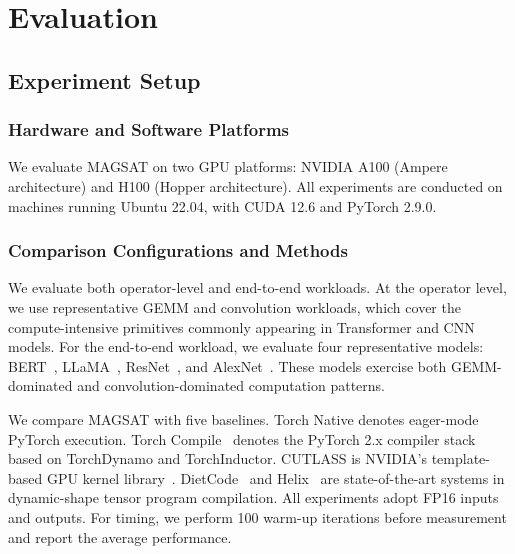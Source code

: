 \section{Evaluation}  %
\label{sec:evaluation}


\subsection{Experiment Setup} 
\label{sec:setup}

\subsubsection{Hardware and Software Platforms} 

We evaluate MAGSAT on two GPU platforms: NVIDIA A100 (Ampere architecture) and H100 (Hopper architecture). 
All experiments are conducted on machines running Ubuntu 22.04, with CUDA 12.6 and PyTorch 2.9.0.

\subsubsection{Comparison Configurations and Methods}

We evaluate both operator-level and end-to-end workloads. At the
operator level, we use representative GEMM and convolution workloads,
which cover the compute-intensive primitives commonly appearing in
Transformer and CNN models. For the end-to-end workload, we evaluate four
representative models: BERT~\cite{devlin2019bert},
LLaMA~\cite{touvron2023llama}, ResNet~\cite{he2016resnet}, and
AlexNet~\cite{krizhevsky2012alexnet}. These models exercise both
GEMM-dominated and convolution-dominated computation patterns.

We compare MAGSAT with five baselines. Torch Native denotes eager-mode
PyTorch execution. Torch Compile~\cite{ansel2024pytorch} denotes the PyTorch
2.x compiler stack based on TorchDynamo and
TorchInductor. CUTLASS is NVIDIA's
template-based GPU kernel library~\cite{nvidia22cutlass}. DietCode~\cite{zheng2022dietcode} and
Helix~\cite{zhou2025helix} are state-of-the-art systems in
dynamic-shape tensor program compilation. All experiments adopt FP16
inputs and outputs. For timing, we perform 100 warm-up iterations before
measurement and report the average performance.

